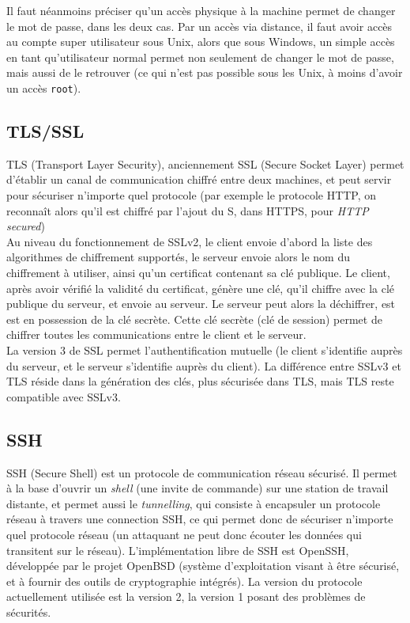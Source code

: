 Il faut néanmoins préciser qu'un accès physique à la machine
permet de changer le mot de passe, dans les deux cas. Par un accès
via distance, il faut avoir accès au compte super utilisateur sous
Unix, alors que sous Windows, un simple accès en tant
qu'utilisateur normal permet non seulement de changer le mot de
passe, mais aussi de le retrouver (ce qui n'est pas possible sous
les Unix, à moins d'avoir un accès \texttt{root}).
\subsection{TLS/SSL}
TLS (Transport Layer Security), anciennement SSL (Secure Socket
Layer) permet d'établir un canal de communication chiffré entre
deux machines, et peut servir pour sécuriser n'importe quel
protocole (par exemple le protocole HTTP, on reconnaît alors qu'il
est chiffré par l'ajout du S, dans HTTPS, pour \emph{HTTP
secured})
\\
 
Au niveau du fonctionnement de SSLv2, le client envoie d'abord la liste des
algorithmes de chiffrement supportés, le serveur envoie alors le
nom du chiffrement à utiliser, ainsi qu'un
certificat contenant sa clé publique. Le client, après avoir
vérifié la validité du certificat, génère une clé, qu'il
chiffre avec la clé publique du serveur, et envoie au serveur.
Le serveur peut alors la déchiffrer, est est
en possession de la clé secrète.
Cette clé secrète (clé de session) permet de chiffrer toutes les
communications entre le client et le serveur.
\\

La version 3 de SSL permet l'authentification mutuelle (le client
s'identifie auprès du serveur, et le serveur s'identifie auprès du
client). La différence entre SSLv3 et TLS réside dans la
génération des clés, plus sécurisée dans TLS, mais TLS reste
compatible avec SSLv3.

\subsection{SSH}
SSH (Secure Shell) est un protocole de communication réseau
sécurisé. Il permet à la base d'ouvrir un \emph{shell} (une invite
de commande) sur une station de travail distante, et permet aussi
le \emph{tunnelling}, qui consiste à encapsuler un protocole
réseau à travers une connection SSH, ce qui permet donc de
sécuriser n'importe quel protocole réseau (un attaquant ne peut
donc écouter les données qui transitent sur le réseau).
L'implémentation libre de SSH est OpenSSH, développée par le
projet OpenBSD (système d'exploitation visant à être sécurisé, et
à fournir des outils de cryptographie intégrés). La version 
du protocole
actuellement utilisée est la version 2, la version 1 posant des
problèmes de sécurités.
\\

